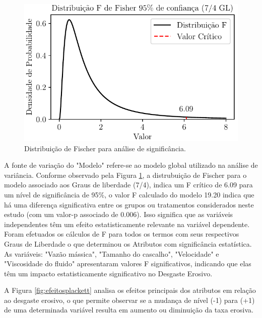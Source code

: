 \begin{figure}[H] 
    \centering  
    \includegraphics{Figuras/fischerplackett.pdf}  
    \caption{Distribuição de Fischer para análise de significância.}  
    \label{fig:fischerplackett}  
\end{figure}


A fonte de variação do "Modelo" refere-se ao modelo global utilizado na análise de variância. Conforme observado pela Figura \ref{fig:fischerplackett}, a distrubuição de Fischer para o modelo associado aos Graus de liberdade (7/4), indica um F crítico de 6.09 para um nível de significância de 95\%, o valor F calculado do modelo 19.20 indica que há uma diferença significativa entre os grupos ou tratamentos considerados neste estudo (com um valor-p associado de 0.006). Isso significa que as variáveis independentes têm um efeito estatisticamente relevante na variável dependente. Foram efetuados os cálculos de F para todos os termos com seus respectivos Graus de Liberdade o que determinou os Atributos com significância estatística. As variáveis: "Vazão mássica", "Tamanho do cascalho", "Velocidade" e "Viscosidade do fluido" apresentaram valores F significativos, indicando que elas têm um impacto estatisticamente significativo no Desgaste Erosivo.

A Figura \ref{fig:efeitosplackett} analisa os efeitos principais dos atributos em relação ao desgaste erosivo, o que permite observar se a mudança de nível (-1) para (+1) de uma determinada variável resulta em aumento ou diminuição da taxa erosiva. 





